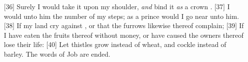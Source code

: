 [36] \textcolor[cmyk]{0.99998,1,0,0}{Surely I would take it upon my shoulder, \emph{and} bind it \emph{as} a crown    .}
[37] \textcolor[cmyk]{0.99998,1,0,0}{I would  unto him the number of my steps; as a prince would I go near unto him.}
[38] \textcolor[cmyk]{0.99998,1,0,0}{If my land cry against  , or that the furrows likewise thereof complain;}
[39] \textcolor[cmyk]{0.99998,1,0,0}{If I have eaten the fruits thereof without money, or have caused the owners thereof   lose their life:}
[40] \textcolor[cmyk]{0.99998,1,0,0}{Let thistles grow instead of wheat, and cockle instead of barley. The words of Job are ended.}